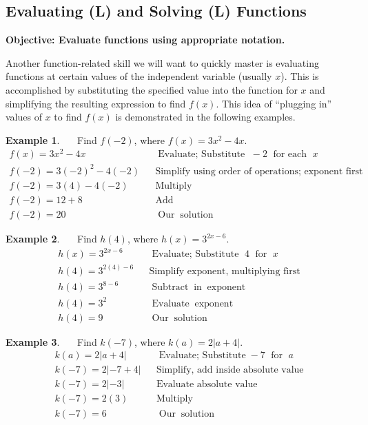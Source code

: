 \documentclass[12pt]{book}
\theoremstyle{definition}
\newtheorem{example}{Example}
\newcommand{\tmop}[1]{\ensuremath{\operatorname{#1}}}
\begin{document}
\subsection{Evaluating (L) and Solving (L) Functions }
{\bf Objective: Evaluate functions using appropriate notation.}\par
Another function-related skill we will want to quickly master is evaluating functions at certain values of the independent variable (usually $x$).  This is accomplished by substituting the specified value into the function for $x$ and simplifying the resulting expression to find $f(x)$.  This idea of ``plugging in'' values of $x$ to find $f(x)$ is demonstrated in the following examples.
\begin{example}~~~Find $f(-2)$, where $f(x)=3x^2-4x$.
  \begin{eqnarray*}
    f (x) = 3 x^2 - 4 x &  & \tmop{Evaluate;~Substitute~} - 2
    \tmop{~for~each~} x\\
    f (- 2) = 3 (- 2)^2 - 4 (- 2) &  & \tmop{Simplify~using~order~of~operations;~exponent~first}\\
    f (- 2) = 3 (4) - 4 (- 2) &  & \tmop{Multiply}\\
    f (- 2) = 12 + 8 &  & \tmop{Add}\\
    f (- 2) = 20 &  & \tmop{Our} \tmop{solution}
  \end{eqnarray*}
\end{example}
\begin{example}~~~Find $h(4)$, where $h(x)=3^{2 x - 6}$.
  \begin{eqnarray*}
    h (x) = 3^{2 x - 6} &  & \tmop{Evaluate;~Substitute~} 4
    \tmop{~for~} x\\
    h (4) = 3^{2 (4) - 6} &  & \tmop{Simplify~exponent,~multiplying~first}\\
    h (4) = 3^{8 - 6} &  & \tmop{Subtract} \tmop{in} \tmop{exponent}\\
    h (4) = 3^2 &  & \tmop{Evaluate} \tmop{exponent}\\
    h (4) = 9 &  & \tmop{Our} \tmop{solution}
  \end{eqnarray*}
\end{example}
\begin{example}~~~Find $k(-7)$, where $k (a) = 2 |a + 4|$.
  \begin{eqnarray*}
    k (a) = 2 |a + 4| &  & \tmop{Evaluate;~Substitute} -7
    \tmop{~for~} a\\
    k (- 7) = 2| - 7 + 4| &  & \tmop{Simplify,~add~inside~absolute~value}\\
    k (- 7) = 2| - 3| &  & \tmop{Evaluate~absolute~value}\\
    k (- 7) = 2 (3) &  & \tmop{Multiply}\\
    k (- 7) = 6 &  & \tmop{Our} \tmop{solution}
  \end{eqnarray*}
\end{example}
\end{document}

